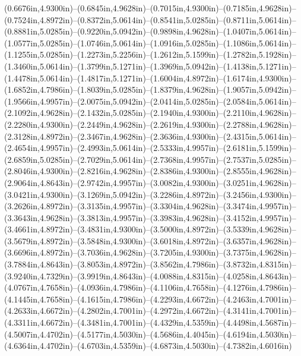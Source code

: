 (0.6676in,4.9300in)--(0.6845in,4.9628in)--(0.7015in,4.9300in)--(0.7185in,4.9628in)--(0.7524in,4.8972in)--(0.8372in,5.0614in)--(0.8541in,5.0285in)--(0.8711in,5.0614in)--(0.8881in,5.0285in)--(0.9220in,5.0942in)--(0.9898in,4.9628in)--(1.0407in,5.0614in)--(1.0577in,5.0285in)--(1.0746in,5.0614in)--(1.0916in,5.0285in)--(1.1086in,5.0614in)--(1.1255in,5.0285in)--(1.2273in,5.2256in)--(1.2612in,5.1599in)--(1.2782in,5.1928in)--(1.3460in,5.0614in)--(1.3799in,5.1271in)--(1.3969in,5.0942in)--(1.4138in,5.1271in)--(1.4478in,5.0614in)--(1.4817in,5.1271in)--(1.6004in,4.8972in)--(1.6174in,4.9300in)--(1.6852in,4.7986in)--(1.8039in,5.0285in)--(1.8379in,4.9628in)--(1.9057in,5.0942in)--(1.9566in,4.9957in)--(2.0075in,5.0942in)--(2.0414in,5.0285in)--(2.0584in,5.0614in)--(2.1092in,4.9628in)--(2.1432in,5.0285in)--(2.1940in,4.9300in)--(2.2110in,4.9628in)--(2.2280in,4.9300in)--(2.2449in,4.9628in)--(2.2619in,4.9300in)--(2.2788in,4.9628in)--(2.3128in,4.8972in)--(2.3467in,4.9628in)--(2.3636in,4.9300in)--(2.4315in,5.0614in)--(2.4654in,4.9957in)--(2.4993in,5.0614in)--(2.5333in,4.9957in)--(2.6181in,5.1599in)--(2.6859in,5.0285in)--(2.7029in,5.0614in)--(2.7368in,4.9957in)--(2.7537in,5.0285in)--(2.8046in,4.9300in)--(2.8216in,4.9628in)--(2.8386in,4.9300in)--(2.8555in,4.9628in)--(2.9064in,4.8643in)--(2.9742in,4.9957in)--(3.0082in,4.9300in)--(3.0251in,4.9628in)--(3.0421in,4.9300in)--(3.1269in,5.0942in)--(3.2286in,4.8972in)--(3.2456in,4.9300in)--(3.2626in,4.8972in)--(3.3135in,4.9957in)--(3.3304in,4.9628in)--(3.3474in,4.9957in)--(3.3643in,4.9628in)--(3.3813in,4.9957in)--(3.3983in,4.9628in)--(3.4152in,4.9957in)--(3.4661in,4.8972in)--(3.4831in,4.9300in)--(3.5000in,4.8972in)--(3.5339in,4.9628in)--(3.5679in,4.8972in)--(3.5848in,4.9300in)--(3.6018in,4.8972in)--(3.6357in,4.9628in)--(3.6696in,4.8972in)--(3.7036in,4.9628in)--(3.7205in,4.9300in)--(3.7375in,4.9628in)--(3.7884in,4.8643in)--(3.8053in,4.8972in)--(3.8562in,4.7986in)--(3.8732in,4.8315in)--(3.9240in,4.7329in)--(3.9919in,4.8643in)--(4.0088in,4.8315in)--(4.0258in,4.8643in)--(4.0767in,4.7658in)--(4.0936in,4.7986in)--(4.1106in,4.7658in)--(4.1276in,4.7986in)--(4.1445in,4.7658in)--(4.1615in,4.7986in)--(4.2293in,4.6672in)--(4.2463in,4.7001in)--(4.2633in,4.6672in)--(4.2802in,4.7001in)--(4.2972in,4.6672in)--(4.3141in,4.7001in)--(4.3311in,4.6672in)--(4.3481in,4.7001in)--(4.4329in,4.5359in)--(4.4498in,4.5687in)--(4.5007in,4.4702in)--(4.5177in,4.5030in)--(4.5686in,4.4045in)--(4.6194in,4.5030in)--(4.6364in,4.4702in)--(4.6703in,4.5359in)--(4.6873in,4.5030in)--(4.7382in,4.6016in) 